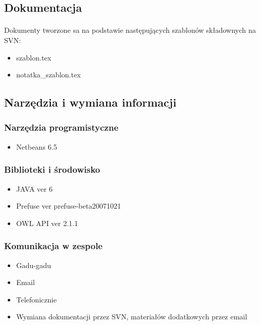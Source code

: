 
\subsection{Dokumentacja}

\paragraph{} Dokumenty tworzone sa na podstawie następujących szablonów składownych na SVN:
\begin{itemize}
 \item szablon.tex
\item notatka\_szablon.tex
\end{itemize}



\subsection{Narzędzia i wymiana informacji}
\subsubsection{Narzędzia programistyczne}
\begin{itemize}
 \item Netbeans 6.5
 
\end{itemize}
\subsubsection{Biblioteki i środowisko}
\begin{itemize}
	\item JAVA ver 6
  	\item Prefuse ver prefuse-beta20071021
	\item OWL API ver 2.1.1
\end{itemize}

\subsubsection{Komunikacja w zespole}
\begin{itemize}
 	\item Gadu-gadu
	\item Email
	\item Telefonicznie
	\item Wymiana dokumentacji przez SVN, materiałów dodatkowych przez email
\end{itemize}


